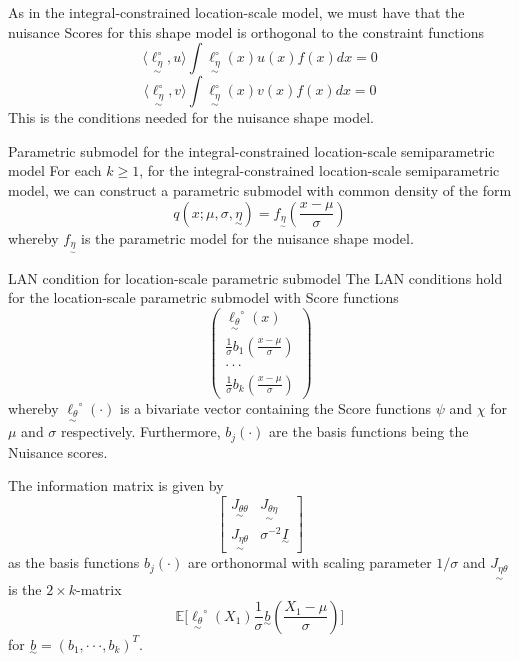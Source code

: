 \documentclass[twoside]{article}
\newcommand{\utilde}{\underset{\sim}}
\begin{document}
As in the integral-constrained location-scale model, we must have that the nuisance Scores for this shape model is orthogonal to the constraint functions 
$$
\langle \utilde{\ell_{\eta}^{\circ}}, u \rangle \int \utilde{\ell_{\eta}^{\circ}}(x)u(x)f(x)dx = 0
$$
$$
\langle \utilde{\ell_{\eta}^{\circ}}, v \rangle \int \utilde{\ell_{\eta}^{\circ}}(x)v(x)f(x)dx = 0
$$
This is the conditions needed for the nuisance shape model.

\begin{definition_exam}{Parametric submodel for the integral-constrained location-scale semiparametric model}
For each $k \geq 1$, for the integral-constrained location-scale semiparametric model, we can construct a parametric submodel with common density of the form 
\begin{equation}
  q(x; \mu, \sigma, \utilde{\eta}) = f_{\utilde{\eta}}(\frac{x - \mu}{\sigma})
\end{equation}
whereby $f_{\utilde{\eta}}$ is the parametric model for the nuisance shape model.
\end{definition_exam}

\begin{theorem_exam}{LAN condition for location-scale parametric submodel}{} The LAN conditions hold for the location-scale parametric submodel with Score functions 
\begin{equation}
\begin{pmatrix}
\utilde{\ell_{\theta}}^{\circ}(x)\\
\frac{1}{\sigma}b_1(\frac{x - \mu}{\sigma})\\
\cdot \cdot \cdot \\
\frac{1}{\sigma}b_k(\frac{x - \mu}{\sigma})
\end{pmatrix}
\end{equation}
whereby $\utilde{\ell_{\theta}}^{\circ}(\cdot)$ is a bivariate vector containing the Score functions $\psi$ and $\chi$ for $\mu$ and $\sigma$ respectively. Furthermore, $b_j(\cdot)$ are the basis functions being the Nuisance scores.

The information matrix is given by 
\begin{equation}
\begin{bmatrix}
\utilde{J_{\theta \theta}} & \utilde{J_{\theta \eta}}\\
\utilde{J_{\eta \theta}} & \sigma^{-2}\utilde{I}
\end{bmatrix}
\end{equation}
as the basis functions $b_j(\cdot)$ are orthonormal with scaling parameter $1/\sigma$ and $\utilde{J_{\eta \theta}}$ is the $2 \times k$-matrix 
$$
\mathbb{E}\big[\utilde{\ell_{\theta}}^{\circ}(X_1) \frac{1}{\sigma}\utilde{b}(\frac{X_1 - \mu}{\sigma}) \big]
$$
for $\utilde{b} = (b_1, \cdot \cdot \cdot, b_k)^T.$
\end{theorem_exam}
\end{document}
